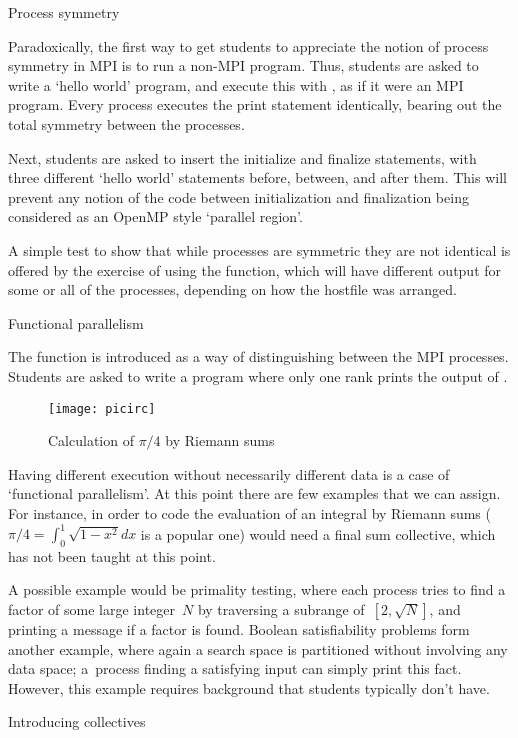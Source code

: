  {Process symmetry}

Paradoxically, the first way to get students to
appreciate
the notion of process symmetry in MPI is to run
a non-MPI program. Thus, students are asked
to write a `hello world' program, and execute this
with , as if it were an MPI program.
Every process executes the print statement identically,
bearing out the total symmetry between the processes.

Next, students are asked to insert the initialize
and finalize statements, with three different `hello world'
statements before, between, and after them.
This will prevent any notion of the code between initialization
and finalization being considered as an OpenMP style `parallel region'.

A simple test to show that while processes are symmetric they are
not identical is offered by the exercise of using the 
function, which will have different output for some or all of the processes,
depending on how the hostfile was arranged.

 {Functional parallelism}

The  function is introduced as a way of distinguishing
between the MPI processes. Students are asked to write a program
where only one rank prints the output of .

\begin{wrapfigure}{r}{1.2in}
  \texttt{[image: picirc]}
  \caption{Calculation of $\pi/4$ by Riemann sums}
\end{wrapfigure}
%
Having different execution without necessarily different data is a case
of `functional parallelism'. At this point there are few examples
that we can assign. For instance, in order to code
the evaluation of an integral by Riemann sums ($\pi/4=\int_0^1\sqrt{1-x^2}dx$
is a popular one) would need a final sum collective, which has
not been taught at this point.

A possible example would be primality testing, where each process
tries to find a factor of some large integer~$N$ by traversing a subrange of~$[2,\sqrt N]$,
and printing a message if a factor is found. Boolean satisfiability problems
form another example, where again a search space is partitioned
without involving any data space; a~process finding a satisfying input
can simply print this fact. However, this example requires background
that students typically don't have.

 {Introducing collectives}

